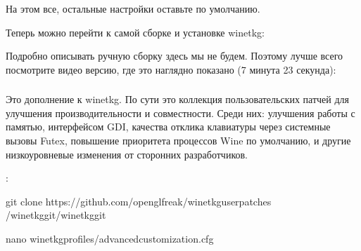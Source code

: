 \documentclass[letterpaper,10pt,russian,openany]{sphinxmanual}
\begin{document}
\sphinxAtStartPar
На этом все, остальные настройки оставьте по умолчанию.

\sphinxAtStartPar
Теперь можно перейти к самой сборке и установке wine\sphinxhyphen{}tkg: 

\sphinxAtStartPar
{}

\sphinxAtStartPar
Подробно описывать ручную сборку здесь мы не будем.
Поэтому лучше всего посмотрите видео версию, где это наглядно показано (7 минута 23 секунда):

\sphinxAtStartPar
{}

\ignorespaces 

\subsubsection{}
\label{\detokenize{source/linux-gaming:wine-tkg-userpatches}}\label{\detokenize{source/linux-gaming:index-6}}\label{\detokenize{source/linux-gaming:id6}}
\sphinxAtStartPar
Это  дополнение к wine\sphinxhyphen{}tkg.
По сути это коллекция пользовательских патчей для улучшения производительности и совместности.
Среди них: улучшения работы с памятью, интерфейсом GDI, качества отклика клавиатуры через системные вызовы Futex,
повышение приоритета процессов Wine по умолчанию, и другие низкоуровневые изменения от сторонних разработчиков.

\sphinxAtStartPar
{}:

\begin{sphinxVerbatim}[commandchars=\\\{\}]
git clone https://github.com/openglfreak/wine\PYGZhy{}tkg\PYGZhy{}userpatches
 \PYGZti{}/wine\PYGZhy{}tkg\PYGZhy{}git/wine\PYGZhy{}tkg\PYGZhy{}git

nano wine\PYGZhy{}tkg\PYGZhy{}profiles/advanced\PYGZhy{}customization.cfg 

\end{sphinxVerbatim}
\end{document}
